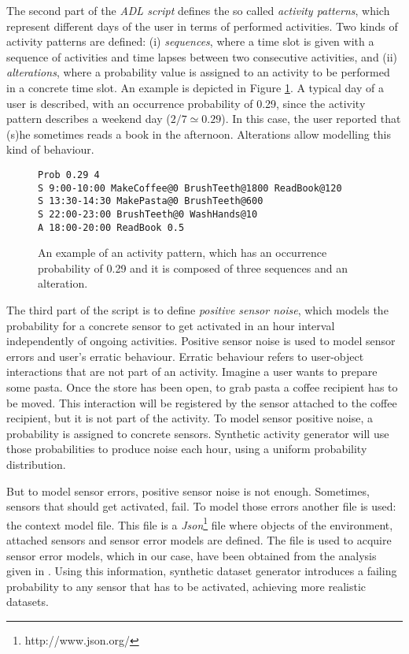 The second part of the \textit{ADL script} defines the so called \textit{activity patterns}, which represent different days of the user in terms of performed activities. Two kinds of activity patterns are defined: (i) \textit{sequences}, where a time slot is given with a sequence of activities and time lapses between two consecutive activities, and (ii) \textit{alterations}, where a probability value is assigned to an activity to be performed in a concrete time slot. An example is depicted in Figure \ref{fig:activity-pattern}. A typical day of a user is described, with an occurrence probability of 0.29, since the activity pattern describes a weekend day ($2/7 \simeq 0.29$). In this case, the user reported that (s)he sometimes reads a book in the afternoon. Alterations allow modelling this kind of behaviour.


\begin{figure}
\begin{small}
\lstset{linewidth=\textwidth}
\begin{lstlisting}
Prob 0.29 4
S 9:00-10:00 MakeCoffee@0 BrushTeeth@1800 ReadBook@120
S 13:30-14:30 MakePasta@0 BrushTeeth@600
S 22:00-23:00 BrushTeeth@0 WashHands@10
A 18:00-20:00 ReadBook 0.5
\end{lstlisting}
\end{small}
\caption{An example of an activity pattern, which has an occurrence probability of 0.29 and it is composed of three sequences and an alteration.}
\label{fig:activity-pattern}
\end{figure}

The third part of the script is to define \textit{positive sensor noise}, which models the probability for a concrete sensor to get activated in an hour interval independently of ongoing activities. Positive sensor noise is used to model sensor errors and user's erratic behaviour. Erratic behaviour refers to user-object interactions that are not part of an activity. Imagine a user wants to prepare some pasta. Once the store has been open, to grab pasta a coffee recipient has to be moved. This interaction will be registered by the sensor attached to the coffee recipient, but it is not part of the activity. To model sensor positive noise, a probability is assigned to concrete sensors. Synthetic activity generator will use those probabilities to produce noise each hour, using a uniform probability distribution. 

But to model sensor errors, positive sensor noise is not enough. Sometimes, sensors that should get activated, fail. To model those errors another file is used: the context model file. This file is a \textit{Json}\footnote{http://www.json.org/} file where objects of the environment, attached sensors and sensor error models are defined. The file is used to acquire sensor error models, which in our case, have been obtained from the analysis given in \cite{Chen2012a}. Using this information, synthetic dataset generator introduces a failing probability to any sensor that has to be activated, achieving more realistic datasets. %

